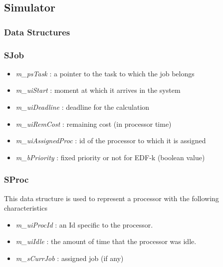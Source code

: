 \documentclass[11pt, a4paper,titlepage]{article}
\begin{document}
\subsection{Simulator}
\subsubsection{Data Structures}
\subsubsection*{SJob}
\begin{itemize}
\item \emph{m\_psTask} : a pointer to the task to which the job belongs
\item \emph{m\_uiStart} : moment at which it arrives in the system
\item \emph{m\_uiDeadline} : deadline for the calculation
\item \emph{m\_uiRemCost} : remaining cost (in processor time)
\item \emph{m\_uiAssignedProc} : id of the processor to which it is assigned
\item \emph{m\_bPriority} : fixed priority or not for EDF-k (boolean value)
\end{itemize}
\subsubsection*{SProc}
This data structure is used to represent a processor with the following characteristics
\begin{itemize}
\item \emph{m\_uiProcId} : an Id specific to the processor.
\item \emph{m\_uiIdle} :  the amount of time that the processor was idle.
\item \emph{m\_sCurrJob} : assigned job (if any)
\end{itemize}
\end{document}

